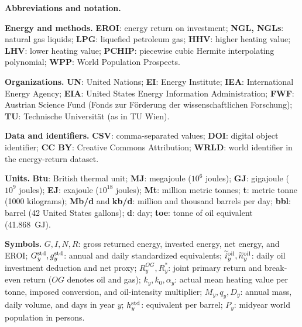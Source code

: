 \documentclass[reprint,aps,pra,longbibliography,floatfix]{revtex4-2}
\begin{document}
\par\endgroup
\par\noindent\begin{minipage}{\textwidth}
\par\medskip\noindent\textbf{Abbreviations and notation.}\par\smallskip
\begingroup\footnotesize
\noindent\textbf{Energy and methods.} \textbf{EROI}: energy return on investment; \textbf{NGL, NGLs}: natural gas liquids; \textbf{LPG}: liquefied petroleum gas; \textbf{HHV}: higher heating value; \textbf{LHV}: lower heating value; \textbf{PCHIP}: piecewise cubic Hermite interpolating polynomial; \textbf{WPP}: World Population Prospects.

\noindent\textbf{Organizations.} \textbf{UN}: United Nations; \textbf{EI}: Energy Institute; \textbf{IEA}: International Energy Agency; \textbf{EIA}: United States Energy Information Administration; \textbf{FWF}: Austrian Science Fund (Fonds zur F\"orderung der wissenschaftlichen Forschung); \textbf{TU}: Technische Universit\"at (as in TU Wien).

\noindent\textbf{Data and identifiers.} \textbf{CSV}: comma-separated values; \textbf{DOI}: digital object identifier; \textbf{CC BY}: Creative Commons Attribution; \textbf{WRLD}: world identifier in the energy-return dataset.

\noindent\textbf{Units.} \textbf{Btu}: British thermal unit; \textbf{MJ}: megajoule ($10^6$ joules); \textbf{GJ}: gigajoule ($10^9$ joules); \textbf{EJ}: exajoule ($10^{18}$ joules); \textbf{Mt}: million metric tonnes; \textbf{t}: metric tonne (1000 kilograms); \textbf{Mb/d} and \textbf{kb/d}: million and thousand barrels per day; \textbf{bbl}: barrel (42 United States gallons); \textbf{d}: day; \textbf{toe}: tonne of oil equivalent (41.868~GJ).

\noindent\textbf{Symbols.} $G,I,N,R$: gross returned energy, invested energy, net energy, and EROI; $G_y^{\rm std},g_y^{\rm std}$: annual and daily standardized equivalents; $\widetilde i_y^{\rm oil},\widetilde n_y^{\rm oil}$: daily oil investment deduction and net proxy; $R_y^{OG},R_y^*$: joint primary return and break-even return ($OG$ denotes oil and gas); $k_y,k_0,\alpha_y$: actual mean heating value per tonne, imposed conversion, and oil-intensity multiplier; $M_y,q_y,D_y$: annual mass, daily volume, and days in year $y$; $h_y^{\rm std}$: equivalent per barrel; $P_y$: midyear world population in persons.
\par\endgroup
\end{minipage}\par\medskip
\end{document}
